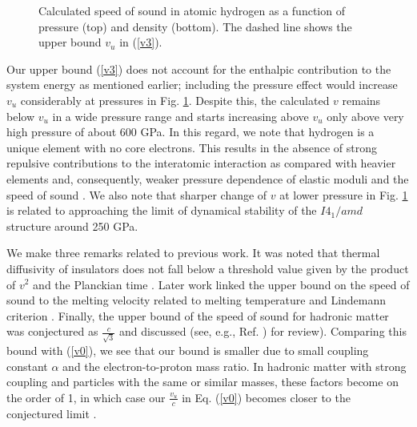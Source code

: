 \documentclass[aps,prl,groupedaddress,fleqn,twocolumn,10pt]{revtex4}
\begin{document}
\begin{figure}
{}
\caption{Calculated speed of sound in atomic hydrogen as a function of pressure (top) and density (bottom). The dashed line shows the upper bound $v_u$ in (\ref{v3}).}
\label{abinitio}
\end{figure}

Our upper bound (\ref{v3}) does not account for the enthalpic contribution to the system energy as mentioned earlier; including the pressure effect would increase $v_u$ considerably at pressures in Fig. \ref{abinitio}. Despite this, the calculated $v$ remains below $v_u$ in a wide pressure range and starts increasing above $v_u$ only above very high pressure of about 600 GPa. In this regard, we note that hydrogen is a unique element with no core electrons. This results in the absence of strong repulsive contributions to the interatomic interaction as compared with heavier elements and, consequently, weaker pressure dependence of elastic moduli and the speed of sound \cite{vadim2}. We also note that sharper change of $v$ at lower pressure in Fig. \ref{abinitio} is related to approaching the limit of dynamical stability of the $I4_1/amd$ structure around 250 GPa.

We make three remarks related to previous work. It was noted that thermal diffusivity of insulators does not fall below a threshold value given by the product of $v^2$ and the Planckian time \cite{behnia}. Later work linked the upper bound on the speed of sound to the melting velocity related to melting temperature and Lindemann criterion \cite{hartnoll1}. Finally, the upper bound of the speed of sound for hadronic matter was conjectured as $\frac{c}{\sqrt{3}}$ and discussed (see, e.g., Ref. \cite{hadronic}) for review). Comparing this bound with (\ref{v0}), we see that our bound is smaller due to small coupling constant $\alpha$ and the electron-to-proton mass ratio. In hadronic matter with strong coupling and particles with the same or similar masses, these factors become on the order of 1, in which case our $\frac{v_u}{c}$ in Eq. (\ref{v0}) becomes closer to the conjectured limit \cite{hadronic}.
\end{document}
